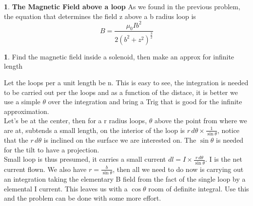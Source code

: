 \documentclass[10pt,letterpaper,twocolumn]{article}
\theoremstyle{definition}
\newtheorem{fct}{\framebox[0.07\textwidth]{{\sffamily Fact}}}[section]
\theoremstyle{definition}
\newtheorem{pr}{\framebox[0.07\textwidth]{Pr}}[section]
\theoremstyle{definition}
\begin{document}
\begin{fct} \textbf{The Magnetic Field above a loop}
As we found in the previous problem, the equation that determines the field z above a b radius loop is
\[B =	\frac{\mu_0 I b^2}{2(b^2 + z^2)^ {\frac{3}{2}}}\]
\end{fct}

\begin{pr}
Find the magnetic field inside a solenoid, then make an approx for infinite length
\end{pr}

Let the loops per a unit length be n. This is easy to see, the integration is needed to be carried out per the loops and as a function of the distace, it is better we use a simple $\theta$ over the integration and bring a Trig that is good for the infinite approximation.\\
Let's be at the center, then for a r radius loops, $\theta$ above the point from where we are at, subtends a small length, on the interior of the loop is $r \, d\theta \times \frac{1}{\sin \theta} $, notice that the $r \, d\theta$ is inclined on the surface we are interested on. The $\sin \theta$ is needed for the tilt to have a projection.\\
Small loop is thus presumed, it carries a small current $ dl = I \times \frac{r\,d\theta}{\sin \theta} $. I is the net current flown. We also have $ r = \frac{b}{\sin \theta}$, then all we need to do now is carrying out an integration taking the elementary B field from the fact of the single loop by a elemental I current. This leaves us with a $\cos \theta $ room of definite integral. Use this and the problem can be done with some more effort.
\end{document}
